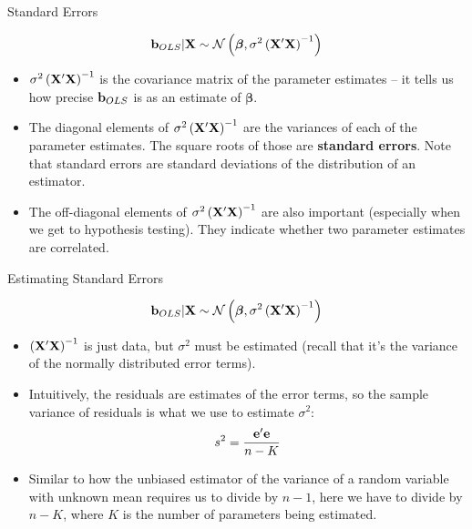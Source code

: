 \documentclass[english,xcolor={dvipsnames},aspectratio=169]{beamer}
\begin{document}
\begin{frame}{Standard Errors}

\[
	{\bf b}_{OLS} | {\bf X} \sim \mathcal{N}\left(\boldsymbol{\beta},\sigma^{2} \left({\bf X}'{\bf X}  \right)^{-1} \right)
	\]

\begin{itemize}
	\item $\sigma^{2} \left({\bf X}'{\bf X}  \right)^{-1}$ is the covariance matrix of the parameter estimates
	-- it tells us how precise ${\bf b}_{OLS}$ is as an estimate of $\boldsymbol{\beta}$.

	\item The diagonal elements of $\sigma^{2} \left({\bf X}'{\bf X}  \right)^{-1}$ are the variances of each of
	the parameter estimates. The square roots of those are {\bf standard errors}. Note that standard
	errors are standard deviations of the distribution of an estimator. 

	\item The off-diagonal elements of $\sigma^{2} \left({\bf X}'{\bf X}  \right)^{-1}$ are also important
	(especially when we get to hypothesis testing).
	They indicate whether two parameter estimates are correlated.

\end{itemize}
\end{frame}

\begin{frame}{Estimating Standard Errors}

\[
	{\bf b}_{OLS} | {\bf X} \sim \mathcal{N}\left(\boldsymbol{\beta},\sigma^{2} \left({\bf X}'{\bf X}  \right)^{-1} \right)
	\]

\begin{itemize}
	\item $\left({\bf X}'{\bf X}  \right)^{-1}$ is just data, but $\sigma^{2}$ must be estimated (recall that it's the 
	variance of the normally distributed error terms). 

	\item Intuitively, the residuals are estimates of the error terms, so the sample variance of residuals
	is what we use to estimate $\sigma^{2}$:\[
	s^{2} = \frac{{\bf e}'{\bf e}}{n-K}
	\]

	\item Similar to how the unbiased estimator of the variance of a random variable with unknown mean requires us to divide
	by $n-1$, here we have to divide by $n-K$, where $K$ is the number of parameters being estimated. 

	
\end{itemize}
\end{frame}
\end{document}
